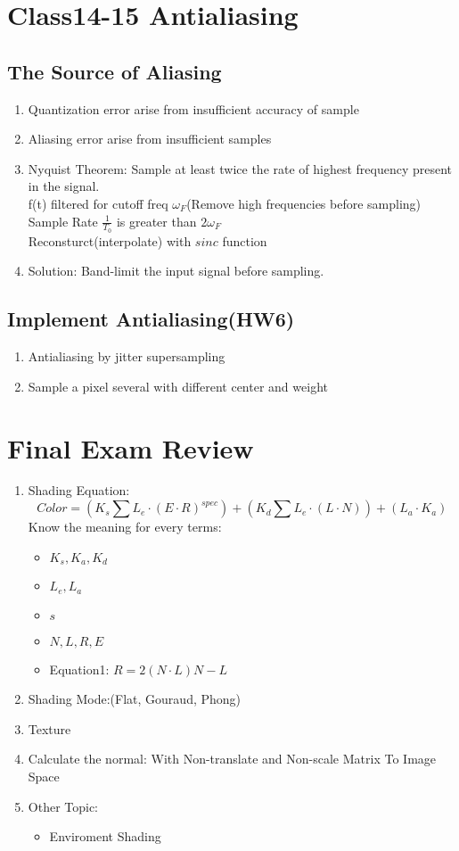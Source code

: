 \documentclass[geye,cyan,normal,en]{elegantnote}
\begin{document}
\section{Class14-15 Antialiasing}
\subsection{The Source of Aliasing}
\begin{enumerate}
	\item Quantization error arise from insufficient accuracy of sample
	\item Aliasing error arise from insufficient samples
	\item Nyquist Theorem: Sample at least twice the rate of highest frequency present in the signal.\\
	f(t) filtered for cutoff freq $\omega_F$(Remove high frequencies before sampling)\\
	Sample Rate $\frac{1}{T_0}$ is greater than $2\omega_F$\\
	Reconsturct(interpolate) with $sinc$ function
	\item Solution: Band-limit the input signal before sampling.
\end{enumerate}
\subsection{Implement Antialiasing(HW6)}
\begin{enumerate}
	\item Antialiasing by jitter supersampling
	\item Sample a pixel several with different center and weight
\end{enumerate}
\newpage

\section{Final Exam Review}
\begin{enumerate}
	\item Shading Equation:
	$$Color=(K_s\sum{ L_e \cdot (E\cdot R)^{spec}}) + (K_d\sum{ L_e \cdot (L\cdot N)}) + (L_a \cdot K_a)$$
	Know the meaning for every terms:
	\begin{itemize}
		\item $K_s,K_a,K_d$
		\item $L_e,L_a$
		\item $s$
		\item $N,L,R,E$
		\item Equation1: $R=2(N\cdot L) N-L$
	\end{itemize}
	\item Shading Mode:(Flat, Gouraud, Phong)
	\item Texture
	\item Calculate the normal: With Non-translate and Non-scale Matrix To Image Space
	\item Other Topic:
	\begin{itemize}
		\item Enviroment Shading 
	\end{itemize}
\end{enumerate}
\end{document}
